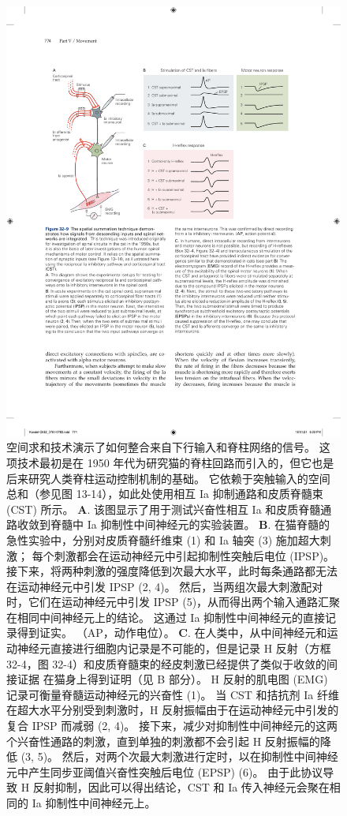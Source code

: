 \begin{figure}[htbp]
	\centering
	\includegraphics[width=0.9\linewidth]{chap32/fig_32_9}
	\caption{空间求和技术演示了如何整合来自下行输入和脊柱网络的信号。
	这项技术最初是在 1950 年代为研究猫的脊柱回路而引入的，但它也是后来研究人类脊柱运动控制机制的基础。
	它依赖于突触输入的空间总和（参见图 13-14），如此处使用相互 Ia 抑制通路和皮质脊髓束 (CST) 所示。
	\textbf{A}. 该图显示了用于测试兴奋性相互 Ia 和皮质脊髓通路收敛到脊髓中 Ia 抑制性中间神经元的实验装置。
	\textbf{B}. 在猫脊髓的急性实验中，分别对皮质脊髓纤维束 (1) 和 Ia 轴突 (3) 施加超大刺激； 每个刺激都会在运动神经元中引起抑制性突触后电位 (IPSP)。
	接下来，将两种刺激的强度降低到次最大水平，此时每条通路都无法在运动神经元中引发 IPSP (2, 4)。
	然后，当两组次最大刺激配对时，它们在运动神经元中引发 IPSP (5)，从而得出两个输入通路汇聚在相同中间神经元上的结论。
	这通过 Ia 抑制性中间神经元的直接记录得到证实。 （AP，动作电位）。
	\textbf{C}. 在人类中，从中间神经元和运动神经元直接进行细胞内记录是不可能的，但是记录 H 反射（方框 32-4，图 32-4）和皮质脊髓束的经皮刺激已经提供了类似于收敛的间接证据 在猫身上得到证明（见 B 部分）。
	H 反射的肌电图 (EMG) 记录可衡量脊髓运动神经元的兴奋性 (1)。
	当 CST 和拮抗剂 Ia 纤维在超大水平分别受到刺激时，H 反射振幅由于在运动神经元中引发的复合 IPSP 而减弱 (2, 4)。
	接下来，减少对抑制性中间神经元的这两个兴奋性通路的刺激，直到单独的刺激都不会引起 H 反射振幅的降低 (3, 5)。
	然后，对两个次最大刺激进行定时，以在抑制性中间神经元中产生同步亚阈值兴奋性突触后电位 (EPSP) (6)。
	由于此协议导致 H 反射抑制，因此可以得出结论，CST 和 Ia 传入神经元会聚在相同的 Ia 抑制性中间神经元上。}
	\label{fig:32_9}
\end{figure}


